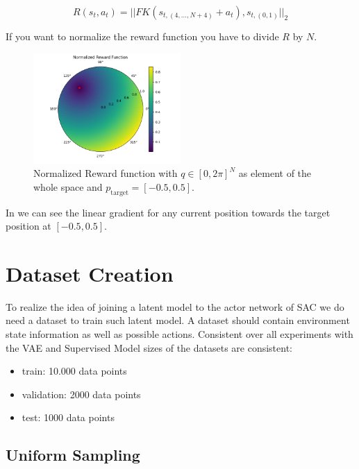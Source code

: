 \begin{equation}\label{eqn:Rewardfunction}
    R(s_t, a_t) = ||FK(s_{t, (4, \ldots, N + 4)}  + a_t), s_{t, (0 ,1)}||_2
\end{equation}

If you want to normalize the reward function you have to divide $R$ by $N$.

\begin{figure}[h]
	\centering
	\includegraphics[width=0.5\textwidth,]{figures/methodology/RewardFunction.png}
	\caption[Reward function]{Normalized Reward function with $q \in [0, 2\pi]^N$ as element of the whole space and $p_\text{target} = [-0.5, 0.5]$. }
	\label{fig:Reward_function}
\end{figure}

In  we can see the linear gradient for any current position towards the target position at $[-0.5, 0.5]$.


\section{Dataset Creation} \label{sec:Dataset_creation}

To realize the idea of joining a latent model to the actor network of SAC we do need a dataset to train such latent model. A dataset should contain environment state information as well as possible actions.
Consistent over all experiments with the VAE and Supervised Model sizes of the datasets are consistent:
\begin{itemize}
    \item train: 10.000 data points
    \item validation: 2000 data points
    \item test: 1000 data points
\end{itemize}

\subsection{Uniform Sampling} \label{sec:vanilla_sampling}

